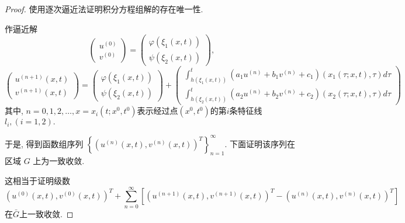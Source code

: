 \begin{proof}
	使用逐次逼近法证明积分方程组解的存在唯一性.
	
	作逼近解
	$$\begin{pmatrix}u^{(0)}\\v^{(0)}\end{pmatrix}=\begin{pmatrix}\varphi(\xi_1(x,t))\\\psi(\xi_2(x,t))\end{pmatrix},$$
	$$\begin{pmatrix}u^{(n+1)}(x,t)\\v^{(n+1)}(x,t)\end{pmatrix}=\begin{pmatrix}\varphi(\xi_1(x,t))\\\psi(\xi_2(x,t))\end{pmatrix}+\begin{pmatrix}\int_{h(\xi_1(x,t))}^t\left(a_1u^{(n)}+b_1v^{(n)}+c_1\right)(x_1(\tau;x,t),\tau)d\tau\\\int_{h(\xi_2(x,t))}^t\left(a_2u^{(n)}+b_2v^{(n)}+c_2\right)(x_2(\tau;x,t),\tau)d\tau\end{pmatrix}$$
	其中, $n=0,1,2,\ldots,x=x_{i}(t;x^{0},t^{0})$表示经过点$(x^{0},t^{0})$的第$i$条特征线	$l_i,(i=1,2).$
	
	于是, 得到函数组序列 $\displaystyle\left\{\left(u^{(n)}(x,t), v^{(n)}(x,t)\right)^{T}\right\}_{n=1}^{\infty}$. 下面证明该序列在区域 $G$ 上为一致收敛.
	
	这相当于证明级数
	\begin{equation}\label{eq:5.11}
		\left(u^{(0)}(x,t),v^{(0)}(x,t)\right)^T+\sum_{n=0}^\infty\left[\left(u^{(n+1)}(x,t),v^{(n+1)}(x,t)\right)^T-\left(u^{(n)}(x,t),v^{(n)}(x,t)\right)^T\right]
	\end{equation}
	在$\bar{G}$上一致收敛.
	

\end{proof}
